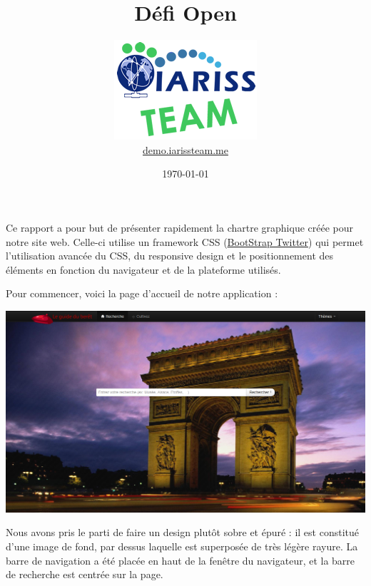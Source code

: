 \documentclass[12pt, a4paper]{article}
\title{Défi Open}
\newcommand{\espace}{\vspace{.8cm}}
\begin{document}
\author{\includegraphics{../_img/iariss_team.png} \\ {\sffamily \href{http://demo.iarissteam.me}{demo.iarissteam.me}}}
\date{\today}

\maketitle{}

{\sffamily Ce rapport a pour but de présenter rapidement la chartre graphique créée pour notre site web. Celle-ci utilise un framework CSS (\href{http://twitter.github.com/bootstrap/}{BootStrap Twitter}) qui permet l'utilisation avancée du CSS, du responsive design et le positionnement des éléments en fonction du navigateur et de la plateforme utilisés.} 

\espace{}
Pour commencer, voici la page d'accueil de notre application : 
\espace{}
\begin{center}
\includegraphics[width=.9\textwidth, keepaspectratio=true]{img/accueil.png}
\end{center}
\espace{}
Nous avons pris le parti de faire un design plutôt sobre et épuré : il est constitué d'une image de fond, par dessus laquelle est superposée de très légère rayure. La barre de navigation a été placée en haut de la fenêtre du navigateur, et la barre de recherche est centrée sur la page.
\end{document}
